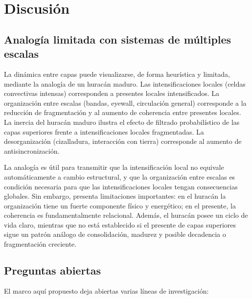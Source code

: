 \section{Discusión}

\subsection{Analogía limitada con sistemas de múltiples escalas}

La dinámica entre capas puede visualizarse, de forma heurística y limitada, mediante la analogía de un huracán maduro. Las intensificaciones locales (celdas convectivas intensas) corresponden a presentes locales intensificados. La organización entre escalas (bandas, eyewall, circulación general) corresponde a la reducción de fragmentación y al aumento de coherencia entre presentes locales. La inercia del huracán maduro ilustra el efecto de filtrado probabilístico de las capas superiores frente a intensificaciones locales fragmentadas. La desorganización (cizalladura, interacción con tierra) corresponde al aumento de antisincronización.

La analogía es útil para transmitir que la intensificación local no equivale automáticamente a cambio estructural, y que la organización entre escalas es condición necesaria para que las intensificaciones locales tengan consecuencias globales. Sin embargo, presenta limitaciones importantes: en el huracán la organización tiene un fuerte componente físico y energético; en el presente, la coherencia es fundamentalmente relacional. Además, el huracán posee un ciclo de vida claro, mientras que no está establecido si el presente de capas superiores sigue un patrón análogo de consolidación, madurez y posible decadencia o fragmentación creciente.

\subsection{Preguntas abiertas}

El marco aquí propuesto deja abiertas varias líneas de investigación:

